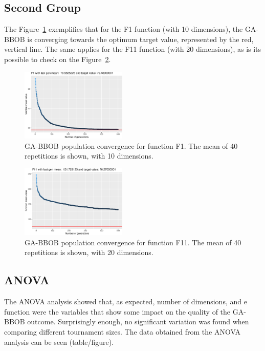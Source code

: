 \subsection{Second Group}
The Figure~\ref{convegenceF1} exemplifies that for the F1 function (with 10 dimensions), the GA-BBOB is converging towards the optimum target value, represented by the red, vertical line. The same applies for the F11 function (with 20 dimensions), as is its possible to check on the Figure~\ref{convegenceF11}.

\begin{figure}[!ht]
	\includegraphics[width=0.45\textwidth]{img/unnamed-chunk-1-1}
	\caption{GA-BBOB population convergence for function F1. The mean of 40 repetitions is shown, with 10 dimensions.}
	\label{convegenceF1}
\end{figure}

\begin{figure}[!ht]
	\includegraphics[width=0.45\textwidth]{img/unnamed-chunk-1-11}
	\caption{GA-BBOB population convergence for function F11. The mean of 40 repetitions is shown, with 20 dimensions.}
	\label{convegenceF11}
\end{figure}

\subsection{ANOVA}
The ANOVA analysis showed that, as expected,  number of dimensions, and e function were the variables that show some impact on the quality of the GA-BBOB outcome. Surprisingly enough,  no significant variation was found when comparing different tournament sizes. The data obtained from the ANOVA analysis can be seen (table/figure).